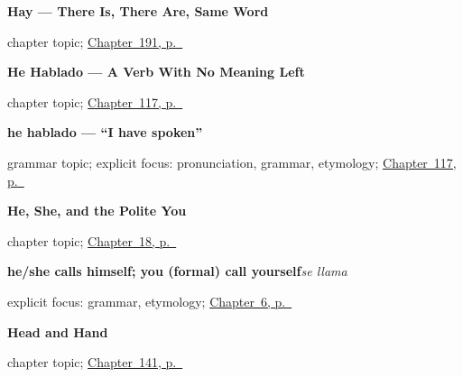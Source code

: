 \noindent\begin{minipage}[t]{\linewidth}
\raggedright
\textbf{Hay --- There Is, There Are, Same Word}\par
\footnotesize chapter topic; \hyperref[ch:hay]{Chapter~191, p.~\pageref*{ch:hay}}
\end{minipage}\par\smallskip

\noindent\begin{minipage}[t]{\linewidth}
\raggedright
\textbf{He Hablado --- A Verb With No Meaning Left}\par
\footnotesize chapter topic; \hyperref[ch:perfect-first-person]{Chapter~117, p.~\pageref*{ch:perfect-first-person}}
\end{minipage}\par\smallskip

\noindent\begin{minipage}[t]{\linewidth}
\raggedright
\textbf{he hablado — \textquotedblleft{}I have spoken\textquotedblright{}}\par
\footnotesize grammar topic; explicit focus: pronunciation, grammar, etymology; \hyperref[ch:perfect-first-person]{Chapter~117, p.~\pageref*{ch:perfect-first-person}}
\end{minipage}\par\smallskip

\noindent\begin{minipage}[t]{\linewidth}
\raggedright
\textbf{He, She, and the Polite You}\par
\footnotesize chapter topic; \hyperref[ch:habla]{Chapter~18, p.~\pageref*{ch:habla}}
\end{minipage}\par\smallskip

\noindent\begin{minipage}[t]{\linewidth}
\raggedright
\textbf{he/she calls himself; you (formal) call yourself}\enspace\emph{se llama}\par
\footnotesize explicit focus: grammar, etymology; \hyperref[ch:asking-a-name]{Chapter~6, p.~\pageref*{ch:asking-a-name}}
\end{minipage}\par\smallskip

\noindent\begin{minipage}[t]{\linewidth}
\raggedright
\textbf{Head and Hand}\par
\footnotesize chapter topic; \hyperref[ch:spanish-head-and-hand]{Chapter~141, p.~\pageref*{ch:spanish-head-and-hand}}
\end{minipage}\par\smallskip

